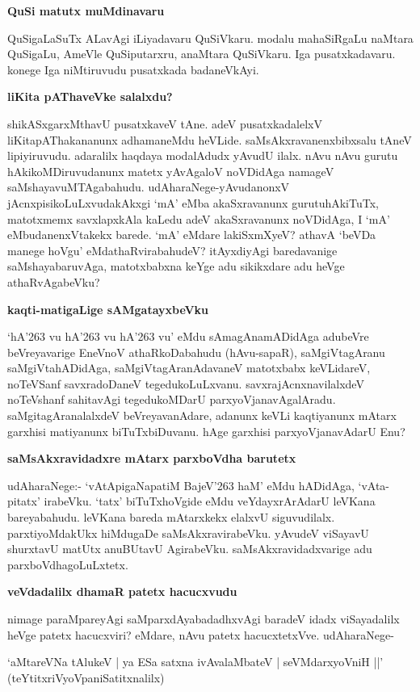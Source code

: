 \noindent
\textbf{QuSi matutx muMdinavaru}\label{page123}

QuSigaLaSuTx ALavAgi iLiyadavaru QuSiVkaru. modalu mahaSiRgaLu naMtara QuSigaLu, AmeVle QuSiputarxru, anaMtara QuSiVkaru. Iga pusatxkadavaru. konege Iga niMtiruvudu pusatxkada badaneVkAyi.

\noindent
\textbf{liKita pAThaveVke salalxdu?}\label{page123}

shikASxgarxMthavU pusatxkaveV tAne. adeV pusatxkadalelxV liKitapAThakananunx adhamaneMdu heVLide. saMsAkxravanenxbibxsalu tAneV lipiyiruvudu. adaralilx haqdaya modalAdudx yAvudU ilalx. nAvu nAvu gurutu hAkikoMDiruvudanunx matetx yAvAgaloV noVDidAga namageV saMshayavuMTAgabahudu. udAharaNege-yAvudanonxV jAcnxpisikoLuLxvudakAkxgi `mA' eMba akaSxravanunx gurutuhAkiTuTx, matotxmemx savxlapxkAla kaLedu adeV akaSxravanunx noVDidAga, I `mA' eMbudanenxVtakekx barede. `mA' eMdare lakiSxmXyeV? athavA `beVDa manege hoVgu'  eMdathaRvirabahudeV? itAyxdiyAgi baredavanige saMshayabaruvAga, matotxbabxna keYge adu sikikxdare adu heVge athaRvAgabeVku?

\noindent
\textbf{kaqti-matigaLige sAMgatayxbeVku}\label{page123}

`hA\char'263 vu hA\char'263 vu hA\char'263 vu' eMdu sAmagAnamADidAga adubeVre beVreyavarige EneVnoV athaRkoDabahudu (hAvu-sapaR), saMgiVtagAranu saMgiVtahADidAga, saMgiVtagAranAdavaneV matotxbabx keVLidareV, noTeVSanf savxradoDaneV tegedukoLuLxvanu. savxrajAcnxnavilalxdeV noTeVshanf sahitavAgi tegedukoMDarU parxyoVjanavAgalAradu. saMgitagAranalalxdeV beVreyavanAdare, adanunx keVLi kaqtiyanunx mAtarx garxhisi matiyanunx biTuTxbiDuvanu. hAge garxhisi parxyoVjanavAdarU Enu?

\noindent
\textbf{saMsAkxravidadxre mAtarx parxboVdha barutetx}\label{page124}

udAharaNege:- `vAtApigaNapatiM BajeV\char'263 haM'\label{124} eMdu hADidAga, `vAta-pitatx' irabeVku. `tatx' biTuTxhoVgide eMdu veYdayxrArAdarU leVKana bareyabahudu. leVKana bareda mAtarxkekx elalxvU siguvudilalx. parxtiyoMdakUkx hiMdugaDe saMsAkxravirabeVku. yAvudeV viSayavU shurxtavU matUtx anuBUtavU AgirabeVku. saMsAkxravidadxvarige adu parxboVdhagoLuLxtetx.

\noindent
\textbf{veVdadalilx dhamaR patetx hacucxvudu}\label{page124}

nimage paraMpareyAgi saMparxdAyabadadhxvAgi baradeV idadx viSayadalilx heVge patetx hacucxviri? eMdare, nAvu patetx hacucxtetxVve. udAharaNege-

\begin{shloka}
`aMtareVNa tAlukeV | ya ESa satxna ivAvalaMbateV | seVMdarxyoVniH ||'\\\label{page124}
\hfill{(teYtitxriVyoVpaniSatitxnalilx)}
\end{shloka}

